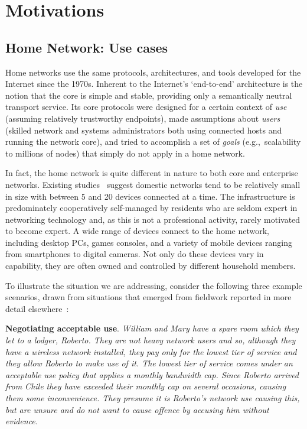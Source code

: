 \section{Motivations}\label{s:evolution}

\subsection{Home Network: Use cases}

Home networks use the same protocols, architectures, and tools developed for the
Internet since the 1970s.  Inherent to the Internet's `end-to-end' architecture
is the notion that the core is simple and stable, providing only a semantically
neutral transport service.  Its core protocols were designed for a certain
context of \emph{use} (assuming relatively trustworthy endpoints), made
assumptions about \emph{users} (skilled network and systems administrators both
using connected hosts and running the network core), and tried to accomplish a
set of \emph{goals} (e.g.,~scalability to millions of nodes) that simply do not
apply in a home network. 

In fact, the home network is quite different in nature to both core and
enterprise networks.  Existing
studies~\cite{tolmie07:_makin,shehan07:_home_networ_hci,shehanpoole08:_desig_inter_home_networ_maint_tools}
suggest domestic networks tend to be relatively small in size with between 5 and
20 devices connected at a time.  The infrastructure is predominately
cooperatively self-managed by residents who are seldom expert in networking
technology and, as this is not a professional activity, rarely motivated to
become expert.  A wide range of devices connect to the home network, including
desktop PCs, games consoles, and a variety of mobile devices ranging from
smartphones to digital cameras.  Not only do these devices vary in capability,
they are often owned and controlled by different household members.  

To illustrate the situation we are addressing, consider the following three
example scenarios, drawn from  situations that emerged from fieldwork 
reported in more detail elsewhere~\cite{wmust2011,chetty10}: 
 
\textbf{Negotiating acceptable use}.  {\it William and Mary have a spare room
  which they let to a lodger, Roberto.  They are not heavy network users and so,
  although they have a wireless network installed, they pay only for the lowest
  tier of service and they allow Roberto to make use of it.  The lowest tier of
  service comes under an acceptable use policy that applies a monthly bandwidth
  cap.  Since Roberto arrived from Chile they have exceeded their monthly cap on
  several occasions, causing them some inconvenience.  They presume it is
  Roberto's network use causing this, but are unsure and do not want to cause
  offence by accusing him without evidence.}

